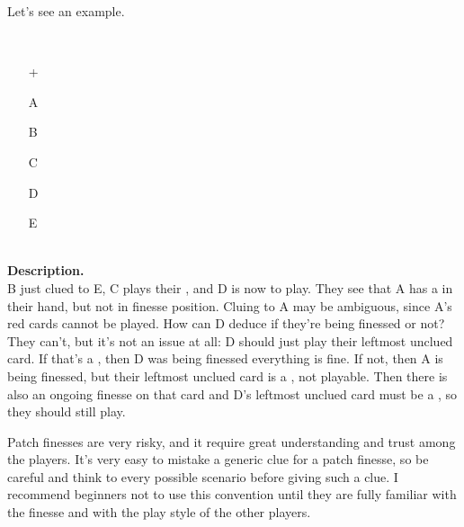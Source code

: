 Let's see an example.

\begin{example}	\hfill \\
	\begin{minipage}{0.45\textwidth}
		\begin{itemize}
			\item[\Large +]      
			\item[\Large A]    
			\item[\Large B]    
			\item[\Large C]    
			\item[\Large D]    
			\item[\Large E]    
		\end{itemize}
	\end{minipage}%
	\begin{minipage}{0.55\textwidth}
		\hfill \\
		
		\textbf{Description.} \\
		
		B just clued  to E, C plays their , and D is now to play. They see that A has a  in their hand, but not in finesse position. Cluing  to A may be ambiguous, since A's red cards cannot be played. How can D deduce if they're being finessed or not? They can't, but it's not an issue at all: D should just play their leftmost unclued card. If that's a , then D was being finessed everything is fine. If not, then A is being finessed, but their leftmost unclued card is a , not playable. Then there is also an ongoing finesse on that card and D's leftmost unclued card must be a , so they should still play.	
	\end{minipage}
\end{example} \vspace{0.15 cm}

\begin{remark}
	Patch finesses are very risky, and it require great understanding and trust among the players. It's very easy to mistake a generic clue for a patch finesse, so be careful and think to every possible scenario before giving such a clue. I recommend beginners not to use this convention until they are fully familiar with the finesse and with the play style of the other players.
\end{remark}

